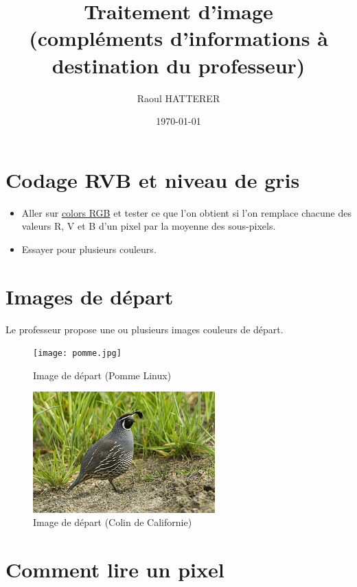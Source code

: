 \documentclass[11pt]{article}
\author{Raoul HATTERER}
\date{\today}
\title{Traitement d'image\\\medskip
\large (compléments d'informations à destination du professeur)}
\begin{document}
\maketitle
\setcounter{tocdepth}{1}
\tableofcontents



\section{Codage RVB et niveau de gris}
\label{sec:org9400dd3}

\begin{itemize}
\item Aller sur \href{https://www.w3schools.com/colors/colors\_rgb.asp}{colors RGB} et tester ce que l'on obtient si l'on remplace chacune des valeurs R, V et B d'un pixel par la moyenne des sous-pixels.
\item Essayer pour plusieurs couleurs.
\end{itemize}


\section{Images de départ}
\label{sec:org7b9165c}

Le professeur propose une ou plusieurs images couleurs de départ.

\begin{figure}[htbp]
\centering
\texttt{[image: pomme.jpg]}
\caption{Image de départ (Pomme Linux)}
\end{figure}



\begin{figure}[htbp]
\centering
\includegraphics[width=7cm]{California_Quail.jpg}
\caption{Image de départ (Colin de Californie)}
\end{figure}


\section{Comment lire un pixel}
\label{sec:org5fc3a70}
\end{document}
